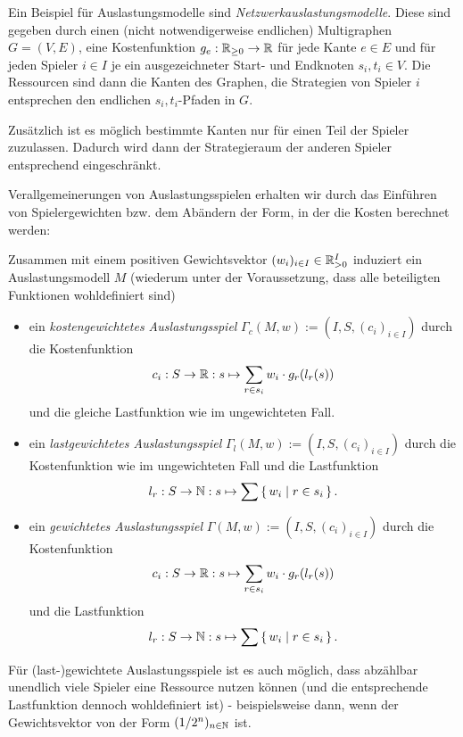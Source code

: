 \begin{bsp}
	Ein Beispiel für Auslastungsmodelle sind \emph{Netzwerkauslastungsmodelle}. Diese sind gegeben durch einen (nicht notwendigerweise endlichen) Multigraphen $G=(V,E)$, eine Kostenfunktion $g_e: \mathbb{R}_{\geq 0} \to \mathbb{R}$ für jede Kante $e \in E$ und für jeden Spieler $i \in I$ je ein ausgezeichneter Start- und Endknoten $s_i, t_i \in V$. Die Ressourcen sind dann die Kanten des Graphen, die Strategien von Spieler $i$ entsprechen den endlichen $s_i,t_i$-Pfaden in $G$. 
	
	Zusätzlich ist es möglich bestimmte Kanten nur für einen Teil der Spieler zuzulassen. Dadurch wird dann der Strategieraum der anderen Spieler entsprechend eingeschränkt.
\end{bsp}

Verallgemeinerungen von Auslastungsspielen erhalten wir durch das Einführen von Spielergewichten bzw. dem Abändern der Form, in der die Kosten berechnet werden:

\begin{defn}\label{def:gewAuslastungsspiel}
	Zusammen mit einem positiven Gewichtsvektor $(w_i)_{i\in I} \in \mathbb{R}_{> 0}^I$ induziert ein Auslastungsmodell $M$ (wiederum unter der Voraussetzung, dass alle beteiligten Funktionen wohldefiniert sind)
	\begin{itemize}
		\item ein \emph{kostengewichtetes Auslastungsspiel} $\Gamma_c(M, w) := (I, S, (c_i)_{i \in I})$ durch die Kostenfunktion
		\[c_i: S \to \mathbb{R}: s \mapsto \sum_{r \in s_i} w_i\cdot g_r(l_r(s)) \]
		und die gleiche Lastfunktion wie im ungewichteten Fall.
		\item ein \emph{lastgewichtetes Auslastungsspiel} $\Gamma_l(M, w) := (I, S, (c_i)_{i \in I})$ durch die Kostenfunktion wie im ungewichteten Fall und die Lastfunktion 
		\[l_r: S \to \mathbb{N}: s \mapsto \sum\set{w_i | r \in s_i}.\]
		\item ein \emph{gewichtetes Auslastungsspiel} $\Gamma(M, w) := (I, S, (c_i)_{i \in I})$ durch die Kostenfunktion
		\[c_i: S \to \mathbb{R}: s \mapsto \sum_{r \in s_i} w_i\cdot g_r(l_r(s)) \]
		und die Lastfunktion 
		\[l_r: S \to \mathbb{N}: s \mapsto \sum\set{w_i | r \in s_i}.\]
	\end{itemize}	
\end{defn}

\begin{beob}
	Für (last-)gewichtete Auslastungsspiele ist es auch möglich, dass abzählbar unendlich viele Spieler eine Ressource nutzen können (und die entsprechende Lastfunktion dennoch wohldefiniert ist) - beispielsweise dann, wenn der Gewichtsvektor von der Form $(1/2^n)_{n \in \mathbb{N}}$ ist.
\end{beob}

